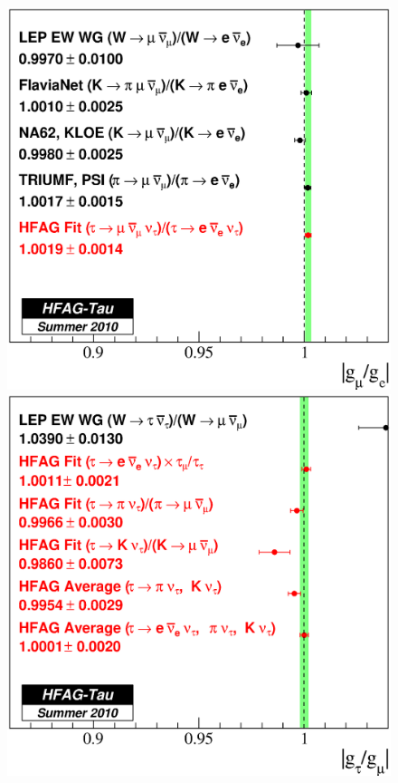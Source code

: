 \documentclass[fleqn,twoside]{article}
\begin{document}
\begin{figure}[!hbtp]
\begin{center}
\begin{minipage}{.42\textwidth}
\includegraphics[height=.3\textheight]{figures/gmuge.eps}
\includegraphics[height=.3\textheight]{figures/gtaugmu.eps}

\end{minipage}
\end{center}
\end{figure}
\end{document}
